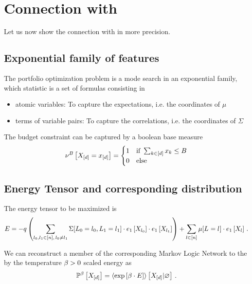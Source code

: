 \documentclass[aps,onecolumn,nofootinbib,pra]{article}
\begin{document}
    \section{Connection with \tnreason}

    Let us now show the connection with \tnreason in more precision.

    \subsection{Exponential family of features}

    The portfolio optimization problem is a mode search in an exponential family, which statistic is a set of formulas consisting in
    \begin{itemize}
        \item atomic variables: To capture the expectations, i.e. the coordinates of $\mu$
        \item terms of variable pairs: To capture the correlations, i.e. the coordinates of $\Sigma$
    \end{itemize}

    The budget constraint can be captured by a boolean base measure
    \begin{align*}
        \nu^{B}\left[X_{[d]}=x_{[d]}\right]
        =\begin{cases}
             1 & \text{if } \sum_{k\in[d]}x_{k} \leq B \\
             0 & \text{else}
        \end{cases}
    \end{align*}

    \subsection{Energy Tensor and corresponding distribution}

    The energy tensor to be maximized is
    \[ E = - q \left(\sum_{l_{0},l_{1}\in[n] , \, l_{0}\neq l_{1}}
    \Sigma[L_{0}=l_{0},L_{1}=l_{1}] \cdot e_{1}\left[X_{l_{0}}\right]\cdot e_{1}\left[X_{l_{1}}\right]\right)
    + \sum_{l\in[n]} \mu[L_{}=l_{}] \cdot e_{1}\left[X_{l}\right] \, . \]

    We can reconstruct a member of the corresponding Markov Logic Network to the by the temperature $\beta>0$ scaled energy as
    \begin{align*}
        \mathbb{P}^{\beta}\left[X_{[d]}\right] = \left\langle \mathrm{exp}\left[\beta\cdot E\right]\right\rangle \left[ X_{[d]} | \varnothing \right] \, .
    \end{align*}
\end{document}
